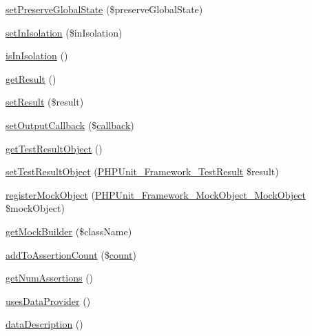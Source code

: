 \begin{DoxyCompactItemize}
\item 
\mbox{\hyperlink{class_p_h_p_unit___framework___test_case_a0913c05cf00cfeef974fa62e6de557d3}{set\+Preserve\+Global\+State}} (\$preserve\+Global\+State)
\item 
\mbox{\hyperlink{class_p_h_p_unit___framework___test_case_a7a67bd1b6d0842dc4791bb4500f76138}{set\+In\+Isolation}} (\$in\+Isolation)
\item 
\mbox{\hyperlink{class_p_h_p_unit___framework___test_case_a89ac4db4fd747843609d565d9409d379}{is\+In\+Isolation}} ()
\item 
\mbox{\hyperlink{class_p_h_p_unit___framework___test_case_ae077eb8a032a325ceb939bfabfa5f472}{get\+Result}} ()
\item 
\mbox{\hyperlink{class_p_h_p_unit___framework___test_case_a02644cacaff67ad8a6b92bbe6127321f}{set\+Result}} (\$result)
\item 
\mbox{\hyperlink{class_p_h_p_unit___framework___test_case_aeb44b0c6a439003287e265eda34bdb05}{set\+Output\+Callback}} (\$\mbox{\hyperlink{class_p_h_p_unit___framework___assert_a9071a07cb9c8a581f500c46731151b0a}{callback}})
\item 
\mbox{\hyperlink{class_p_h_p_unit___framework___test_case_af7add312bb1acaebcca0aff36a8b6293}{get\+Test\+Result\+Object}} ()
\item 
\mbox{\hyperlink{class_p_h_p_unit___framework___test_case_a0b9e48252e55412374d4b2a45bc13c71}{set\+Test\+Result\+Object}} (\mbox{\hyperlink{class_p_h_p_unit___framework___test_result}{P\+H\+P\+Unit\+\_\+\+Framework\+\_\+\+Test\+Result}} \$result)
\item 
\mbox{\hyperlink{class_p_h_p_unit___framework___test_case_a467e3cf368d51b2bba62b1825be9847b}{register\+Mock\+Object}} (\mbox{\hyperlink{interface_p_h_p_unit___framework___mock_object___mock_object}{P\+H\+P\+Unit\+\_\+\+Framework\+\_\+\+Mock\+Object\+\_\+\+Mock\+Object}} \$mock\+Object)
\item 
\mbox{\hyperlink{class_p_h_p_unit___framework___test_case_a6777abc204e3cf02ffc9644934b6eacd}{get\+Mock\+Builder}} (\$class\+Name)
\item 
\mbox{\hyperlink{class_p_h_p_unit___framework___test_case_a79931183d3403f1a8bba9cb4d8cab498}{add\+To\+Assertion\+Count}} (\$\mbox{\hyperlink{class_p_h_p_unit___framework___test_case_ac751e87b3d4c4bf2feb03bee8b092755}{count}})
\item 
\mbox{\hyperlink{class_p_h_p_unit___framework___test_case_af1e160d4fe1e78ac3e58f018b530911c}{get\+Num\+Assertions}} ()
\item 
\mbox{\hyperlink{class_p_h_p_unit___framework___test_case_aaceec449a3d3d496a69aa56450adbfeb}{uses\+Data\+Provider}} ()
\item 
\mbox{\hyperlink{class_p_h_p_unit___framework___test_case_a98d66c12d924661754af0145ee3537e0}{data\+Description}} ()
\end{DoxyCompactItemize}
